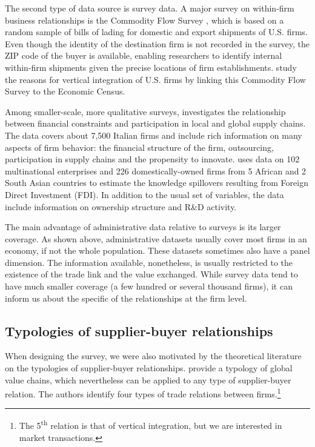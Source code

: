 \documentclass[final, dvipsnames, authoryear,12pt]{elsarticle}
\begin{document}
The second type of data source is survey data. A major survey on within-firm business relationships is the Commodity Flow Survey \cite{CFS}, which is based on a random sample of bills of lading for domestic and export shipments of U.S. firms. Even though the identity of the destination firm is not recorded in the survey, the ZIP code of the buyer is available, enabling researchers to identify internal within-firm shipments given the precise locations of firm establishments. \cite{atalay2014vertical} study the reasons for vertical integration of U.S. firms by linking this Commodity Flow Survey to the Economic Census.  


Among smaller-scale, more qualitative surveys, \cite{minetti2018financial} investigates the relationship between financial constraints and participation in local and global supply chains. The data covers about 7,500 Italian firms and include rich information on many aspects of firm behavior: the financial structure of the firm, outsourcing, participation in supply chains and the propensity to innovate. \cite{newman2018linked}  uses data on 102 multinational enterprises and 226 domestically-owned firms from 5 African and 2 South Asian countries to estimate the knowledge spillovers resulting from Foreign Direct Investment (FDI). In addition to the usual set of variables, the data include information on ownership structure and R\&D activity.

The main advantage of administrative data relative to surveys is its larger coverage. As shown above, administrative datasets usually cover most firms in an economy, if not the whole population. These datasets sometimes also have a panel dimension. The information available, nonetheless, is usually restricted to the existence of the trade link and the value exchanged. While survey data tend to have much smaller coverage (a few hundred or several thousand firms), it can inform us about the specific of the relationships at the firm level.

\subsection{Typologies of supplier-buyer relationships}
\label{sec:typologies}

When designing the survey, we were also motivated by the theoretical literature on the typologies of supplier-buyer relationships.  \cite{gereffi2005governance} provide a typology of global value chains, which nevertheless can be applied to any type of supplier-buyer relation. The authors identify four types of trade relations between firms.\footnote{The 5\textsuperscript{th} relation is that of vertical integration, but we are interested in market transactions.}
\end{document}
